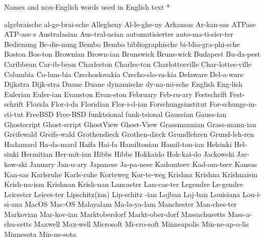 \head * Names and non-English words \break used in English text *

\begingroup
\eightpoint
\1 algebraische 	al-ge-brai-sche
\1 Allegheny		Al-le-ghe-ny
\1 Arkansas		Ar-kan-sas
\5 ATPase		ATP-ase s		%
\1 Australasian 	Aus-tral-asian
\1 automatisierter	auto-ma-ti-sier-ter
\1 Bedienung		Be-die-nung
\1 Bembo                Bembo			%
\1 bibliographische	bi-blio-gra-phi-sche
\1 Boston		Bos-ton
\1 Brownian		Brown-ian
\1 Brunswick		Bruns-wick
\1 Budapest		Bu-da-pest
\1 Caribbean		Car-ib-bean
\1 Charleston		Charles-ton
\1 Charlottesville	Char-lottes-ville
\1 Columbia		Co-lum-bia
\1 Czechoslovakia	Czecho-slo-va-kia
\1 Delaware		Del-a-ware		%
\1 Dijkstra		Dijk-stra
\1 Duane		Duane			%
\1 dynamische		dy-na-mi-sche
\1 English		Eng-lish
\1 Eulerian		Euler-ian
\1 Evanston		Evan-ston
\1 February		Feb-ru-ary
\1 Festschrift		Fest-schrift
\1 Florida		Flor-i-da
\1 Floridian		Flor-i-d-ian
\1 Forschungsinstitut	For-schungs-in-sti-tut
\1 FreeBSD		Free-BSD		%
\1 funktsional		funk-tsional
\1 Gaussian		Gauss-ian
\1 Ghostscript		Ghost-script		%
\1 GhostView		Ghost-View		%
\1 Grassmannian		Grass-mann-ian		%
\1 Greifswald		Greifs-wald
\1 Grothendieck		Grothen-dieck
\1 Grundlehren		Grund-leh-ren
\1 Hadamard		Ha-da-mard		%
\1 Haifa		Hai-fa
\1 Hamiltonian		Hamil-ton-ian
\1 Helsinki		Hel-sinki
\1 Hermitian		Her-mit-ian
\1 Hibbs		Hibbs
\1 Hokkaido		Hok-kai-do
\1 Jackowski		Jac-kow-ski		%
\1 January		Jan-u-ary
\1 Japanese		Ja-pa-nese
\1 Kadomtsev		Kad-om-tsev
\1 Kansas		Kan-sas
\1 Karlsruhe		Karls-ruhe
\1 Korteweg		Kor-te-weg
\1 Krishna		Krishna
\1 Krishnaism		Krish-na-ism
\1 Krishnan		Krish-nan	%
\1 Lancaster		Lan-cas-ter
\1 Legendre		Le-gendre
\1 Leicester		Leices-ter
\2 Lipschitz(ian)	Lip-schitz -ian
\1 Lojban		Loj-ban		%
\1 Louisiana		Lou-i-si-ana
\1 MacOS		Mac-OS			%
\NewWordtrue
\1 Malayalam		Ma-la-ya-lam		%
\1 Manchester		Man-ches-ter
\1 Markovian		Mar-kov-ian
\1 Marktoberdorf	Markt-ober-dorf  %
\1 Massachusetts	Mass-a-chu-setts
\1 Maxwell		Max-well		%
\1 Microsoft		Mi-cro-soft		%
\1 Minneapolis		Min-ne-ap-o-lis
\1 Minnesota		Min-ne-sota
